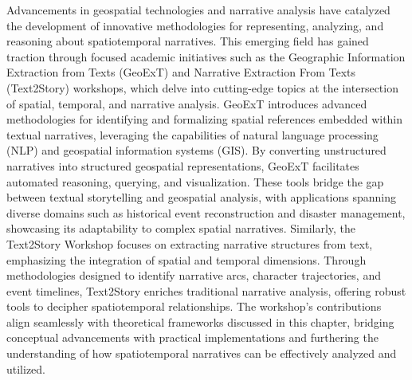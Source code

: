 Advancements in geospatial technologies and narrative analysis have catalyzed the development of innovative methodologies for representing, analyzing, and reasoning about spatiotemporal narratives. This emerging field has gained traction through focused academic initiatives such as the Geographic Information Extraction from Texts (GeoExT) and Narrative Extraction From Texts (Text2Story) workshops, which delve into cutting-edge topics at the intersection of spatial, temporal, and narrative analysis. GeoExT \cite{huProceedingsFirstWorkshop2023, huProceedingsGeoExT20242024} introduces advanced methodologies for identifying and formalizing spatial references embedded within textual narratives, leveraging the capabilities of natural language processing (NLP) and geospatial information systems (GIS). By converting unstructured narratives into structured geospatial representations, GeoExT facilitates automated reasoning, querying, and visualization. These tools bridge the gap between textual storytelling and geospatial analysis, with applications spanning diverse domains such as historical event reconstruction and disaster management, showcasing its adaptability to complex spatial narratives. Similarly, the Text2Story Workshop \cite{camposProceedingsText2StoryFourth2021, camposProceedingsText2StoryFifth2022, camposProceedingsText2StorySixth2023, camposProceedingsText2StorySeventh2024} focuses on extracting narrative structures from text, emphasizing the integration of spatial and temporal dimensions. Through methodologies designed to identify narrative arcs, character trajectories, and event timelines, Text2Story enriches traditional narrative analysis, offering robust tools to decipher spatiotemporal relationships. The workshop’s contributions align seamlessly with theoretical frameworks discussed in this chapter, bridging conceptual advancements with practical implementations and furthering the understanding of how spatiotemporal narratives can be effectively analyzed and utilized.


